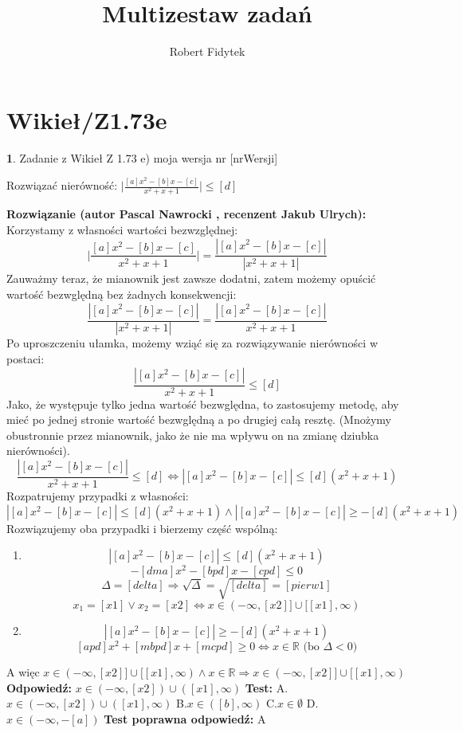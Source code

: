 \documentclass[12pt, a4paper]{article}
\title{Multizestaw zadań}
\author{Robert Fidytek}
\date{}
\theoremstyle{definition} %
\newtheorem{zad}{}
\newcommand{\kategoria}[1]{\section{#1}} %
\newcommand{\zadStart}[1]{\begin{zad}#1\newline} %
\newcommand{\zadStop}{\end{zad}}   %
\newcommand{\rozwStart}[2]{\noindent \textbf{Rozwiązanie (autor #1 , recenzent #2): }\newline} %
\newcommand{\rozwStop}{\newline}                                            %
\newcommand{\odpStart}{\noindent \textbf{Odpowiedź:}\newline}    %
\newcommand{\odpStop}{\newline}                                             %
\newcommand{\testStart}{\noindent \textbf{Test:}\newline} %
\newcommand{\testStop}{\newline} %
\newcommand{\kluczStart}{\noindent \textbf{Test poprawna odpowiedź:}\newline} %
\newcommand{\kluczStop}{\newline} %
\begin{document}
\maketitle


\kategoria{Wikieł/Z1.73e}
\zadStart{Zadanie z Wikieł Z 1.73 e) moja wersja nr [nrWersji]}

Rozwiązać nierówność: $\big|\frac{[a]x^2-[b]x-[c]}{x^2+x+1}\big|\leq[d]$
\zadStop
\rozwStart{Pascal Nawrocki}{Jakub Ulrych}
Korzystamy z własności wartości bezwzględnej:
$$\bigg|\frac{[a]x^2-[b]x-[c]}{x^2+x+1}\bigg|=\frac{|[a]x^2-[b]x-[c]|}{|x^2+x+1|}$$
Zauważmy teraz, że mianownik jest zawsze dodatni, zatem możemy opuścić wartość bezwględną bez żadnych konsekwencji:
$$\frac{|[a]x^2-[b]x-[c]|}{|x^2+x+1|}=\frac{|[a]x^2-[b]x-[c]|}{x^2+x+1}$$
Po uproszczeniu ułamka, możemy wziąć się za rozwiązywanie nierówności w postaci:
$$\frac{|[a]x^2-[b]x-[c]|}{x^2+x+1}\leq[d]$$
Jako, że występuje tylko jedna wartość bezwględna, to zastosujemy metodę, aby mieć po jednej stronie wartość bezwględną a po drugiej całą resztę. (Mnożymy obustronnie przez mianownik, jako że nie ma wpływu on na zmianę dziubka nierówności).
$$\frac{|[a]x^2-[b]x-[c]|}{x^2+x+1}\leq[d]\Leftrightarrow|[a]x^2-[b]x-[c]|\leq[d](x^2+x+1)$$
Rozpatrujemy przypadki z własności:
$$|[a]x^2-[b]x-[c]|\leq[d](x^2+x+1) \wedge |[a]x^2-[b]x-[c]|\geq-[d](x^2+x+1)$$
Rozwiązujemy oba przypadki i bierzemy część wspólną:
\begin{enumerate}
\item$$|[a]x^2-[b]x-[c]|\leq[d](x^2+x+1)$$
$$-[dma]x^2-[bpd]x-[cpd]\leq0$$
$$\Delta=[delta]\Rightarrow\sqrt{\Delta}=\sqrt{[delta]}=[pierw1]$$
$$x_1=[x1] \vee x_2=[x2]\Leftrightarrow x\in(-\infty,[x2]]\cup[[x1],\infty)$$
\item$$|[a]x^2-[b]x-[c]|\geq-[d](x^2+x+1)$$
$$[apd]x^2+[mbpd]x+[mcpd]\geq0\Leftrightarrow x\in\mathbb{R} \text{ (bo $\Delta<0$)}$$
\end{enumerate}
A więc $x\in(-\infty,[x2]]\cup[[x1],\infty) \wedge x\in\mathbb{R} \Rightarrow  x\in(-\infty,[x2]]\cup[[x1],\infty)$
\rozwStop
\odpStart
$x\in(-\infty,[x2])\cup([x1],\infty)$
\odpStop
\testStart
A. $x\in(-\infty,[x2])\cup([x1],\infty)$
B.$x\in([b],\infty)$
C.$x\in\emptyset$
D.$x\in(-\infty,-[a])$
\testStop
\kluczStart
A
\kluczStop
\end{document}
